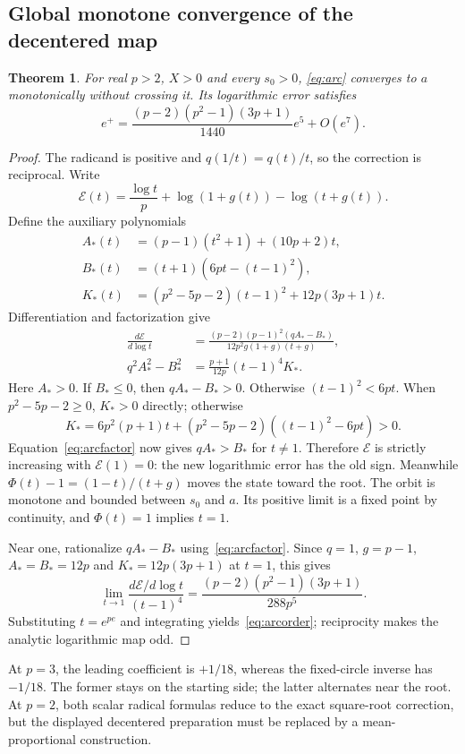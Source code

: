 \documentclass[11pt,a4paper]{article}
\newtheorem{theorem}{Theorem}[section]\newtheorem{proposition}[theorem]{Proposition}
\begin{document}
\subsection{Global monotone convergence of the decentered map}
\begin{theorem}\label{thm:arc}
For real $p>2$, $X>0$ and every $s_0>0$, \eqref{eq:arc} converges to $a$ monotonically without crossing it. Its logarithmic error satisfies
\begin{equation}\label{eq:arcorder}
 e^+=\frac{(p-2)(p^2-1)(3p+1)}{1440}e^5+O(e^7).
\end{equation}
\end{theorem}
\begin{proof}
The radicand is positive and $q(1/t)=q(t)/t$, so the correction is reciprocal. Write
\[
 \mathcal E(t)=\frac{\log t}{p}+\log(1+g(t))-\log(t+g(t)).
\]
Define the auxiliary polynomials
\begin{align*}
 A_*(t)&=(p-1)(t^2+1)+(10p+2)t,\\
 B_*(t)&=(t+1)(6pt-(t-1)^2),\\
 K_*(t)&=(p^2-5p-2)(t-1)^2+12p(3p+1)t.
\end{align*}
Differentiation and factorization give
\begin{align}
 \frac{d\mathcal E}{d\log t}
 &=\frac{(p-2)(p-1)^2(qA_*-B_*)}{12p^2g(1+g)(t+g)},\label{eq:arcder}\\
 q^2A_*^2-B_*^2&=\frac{p+1}{12p}(t-1)^4K_* .\label{eq:arcfactor}
\end{align}
Here $A_*>0$. If $B_*\le0$, then $qA_*-B_*>0$. Otherwise $(t-1)^2<6pt$. When $p^2-5p-2\ge0$, $K_*>0$ directly; otherwise
\[
 K_*=6p^2(p+1)t+(p^2-5p-2)((t-1)^2-6pt)>0.
\]
Equation~\eqref{eq:arcfactor} now gives $qA_*>B_*$ for $t\ne1$. Therefore $\mathcal E$ is strictly increasing with $\mathcal E(1)=0$: the new logarithmic error has the old sign. Meanwhile $\Phi(t)-1=(1-t)/(t+g)$ moves the state toward the root. The orbit is monotone and bounded between $s_0$ and $a$. Its positive limit is a fixed point by continuity, and $\Phi(t)=1$ implies $t=1$.

Near one, rationalize $qA_*-B_*$ using~\eqref{eq:arcfactor}. Since $q=1$, $g=p-1$, $A_*=B_*=12p$ and $K_*=12p(3p+1)$ at $t=1$, this gives
\[
 \lim_{t\to1}\frac{d\mathcal E/d\log t}{(t-1)^4}
 =\frac{(p-2)(p^2-1)(3p+1)}{288p^5}.
\]
Substituting $t=e^{pe}$ and integrating yields~\eqref{eq:arcorder}; reciprocity makes the analytic logarithmic map odd.
\end{proof}
At $p=3$, the leading coefficient is $+1/18$, whereas the fixed-circle inverse has $-1/18$. The former stays on the starting side; the latter alternates near the root. At $p=2$, both scalar radical formulas reduce to the exact square-root correction, but the displayed decentered preparation must be replaced by a mean-proportional construction.
\clearpage
\end{document}
